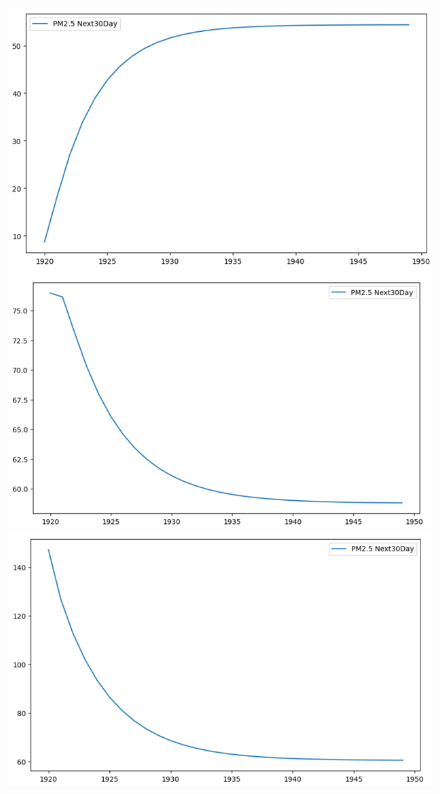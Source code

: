 
\begin{figure}[H]

    \centering
    \begin{minipage}{0.15\textwidth}
    \centering
    \end{minipage}
    \hfill

    \begin{minipage}{0.15\textwidth}
    \centering
    \includegraphics[width=1\textwidth]{img/final/VAR/VAR_7_3_HN_30D.png}
    \end{minipage}
    \hfill
    \begin{minipage}{0.15\textwidth}
    \centering
    \includegraphics[width=1\textwidth]{img/final/VAR/VAR_8_2_HN_30D.png}
    \end{minipage}
    \hfill
    \begin{minipage}{0.15\textwidth}
    \centering
    \includegraphics[width=1\textwidth]{img/final/VAR/VAR_9_1_HN_30D.png}

\end{minipage}
\end{figure}
